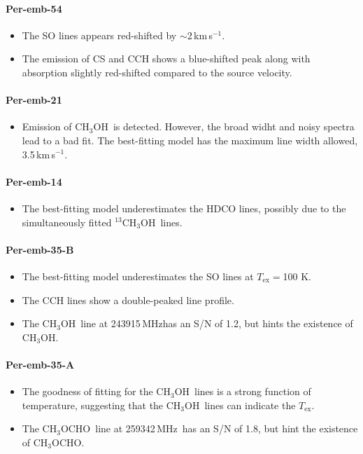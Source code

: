\documentclass[twocolumn]{aastex62}
\newcommand{\kms}{\mbox{\,km\,s$^{-1}$}}
\newcommand{\mhz}{\mbox{\,MHz}}
\newcommand{\methylformate}{\mbox{CH$_{3}$OCHO}}
\newcommand{\methanol}{\mbox{CH$_{3}$OH}}
\newcommand{\tmethanol}{\mbox{$^{13}$CH$_{3}$OH}}
\begin{document}
\paragraph{Per-emb-54}
\begin{itemize}
  \item The SO lines appears red-shifted by $\sim$2\kms.
  \item The emission of CS and CCH shows a blue-shifted peak along with absorption slightly red-shifted compared to the source velocity.
\end{itemize}

\paragraph{Per-emb-21}
\begin{itemize}
  \item Emission of \methanol\ is detected.  However, the broad widht and noisy spectra lead to a bad fit.  The best-fitting model has the maximum line width allowed, 3.5\kms.
\end{itemize}

\paragraph{Per-emb-14}
\begin{itemize}
  \item The best-fitting model underestimates the HDCO lines, possibly due to the simultaneously fitted \tmethanol\ lines.
\end{itemize}

\paragraph{Per-emb-35-B}
\begin{itemize}
  \item The best-fitting model underestimates the SO lines at $T_\text{ex} = $100 K.
  \item The CCH lines show a double-peaked line profile.
  \item The \methanol\ line at 243915\mhz has an S/N of 1.2, but hints the existence of \methanol.
\end{itemize}

\paragraph{Per-emb-35-A}
\begin{itemize}
  \item The goodness of fitting for the \methanol\ lines is a strong function of temperature, suggesting that the \methanol\ lines can indicate the $T_\text{ex}$.
  \item The \methylformate\ line at 259342\mhz\ has an S/N of 1.8, but hint the existence of \methylformate.
\end{itemize}
\end{document}
